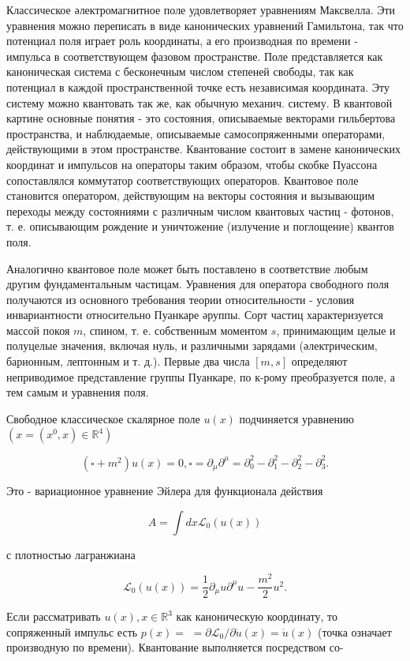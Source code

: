 \documentclass[10pt]{article}
\begin{document}
Классическое әлектромагнитное поле удовлетворяет уравнениям Максвелла. Эти уравнения можно переписать в виде канонических уравнений Гамильтона, так что потенциал поля играет роль координаты, а его производная по времени - импульса в соответствующем фазовом пространстве. Поле представляется как каноническая система с бесконечным числом степеней свободы, так как потенциал в каждой пространственной точке есть независимая координата. Эту систему можно квантовать так же, как обычную механич. систему. В квантовой картине основные понятия - это состояния, описываемые векторами гильбертова пространства, и наблюдаемые, описываемые самосопряженными операторами, действующими в этом пространстве. Квантование состоит в замене канонических координат и импульсов на операторы таким образом, чтобы скобке Пуассона сопоставлялся коммутатор соответствующих операторов. Квантовое поле становится оператором, действующим на векторы состояния и вызывающим переходы между состояниями с различным числом квантовых частиц - фотонов, т. е. описывающим рождение и уничтожение (излучение и поглощение) квантов поля.



Аналогично квантовое поле может быть поставлено в соответствие любым другим фундаментальным частицам. Уравнения для оператора свободного поля получаются из основного требования теории относительности - условия инвариантности относительно Пуанкаре әруппы. Сорт частиц характеризуется массой покоя $m$, спином, т. е. собственным моментом $s$, принимающим целые и полуцелые значения, включая нуль, и различными зарядами (әлектрическим, барионным, лептонным и т. д.). Первые два числа $[m, s]$ определяют неприводимое представление группы Пуанкаре, по к-рому преобразуется поле, а тем самым и уравнения поля.



Свободное классическое скалярное поле $u(x)$ подчиняется уравнению $\left(x=\left(x^{0}, x\right) \in \mathbb{R}^{4}\right)$



\[

\left(\square+m^{2}\right) u(x)=0, \square=\partial_{\mu} \partial^{\mu}=\partial_{0}^{2}-\partial_{1}^{2}-\partial_{2}^{2}-\partial_{3}^{2} .

\]



Это - вариационное уравнение Эйлера для функционала действия



\[

A=\int d x \mathscr{L}_{0}(u(x))

\]



с плотностью лагранжиана



\[

\mathscr{L}_{0}(u(x))=\frac{1}{2} \partial_{\mu} u \partial^{\mu} u-\frac{m^{2}}{2} u^{2} .

\]



Если рассматривать $u(x), x \in \mathbb{R}^{3}$ как каноническую координату, то сопряженный импульс есть $p(x)=$ $=\partial \mathscr{L}_{0} / \partial \dot{u}(x)=\dot{u}(x)$ (точка означает производную по времени). Квантование выполняется посредством со-
\end{document}
